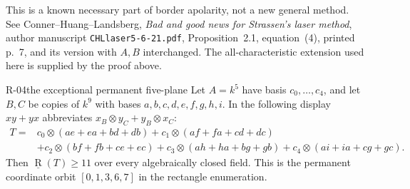 This is a known necessary part of border apolarity, not a new
general method. See Conner--Huang--Landsberg,
\emph{Bad and good news for Strassen's laser method},
author manuscript \texttt{CHLlaser5-6-21.pdf}, Proposition~2.1,
equation~(4), printed p.~7, and its version with $A,B$ interchanged.
The all-characteristic extension used here is supplied by the proof above.

\begin{finding}{R-04}{the exceptional permanent five-plane}
Let $A=k^5$ have basis $c_0,\ldots,c_4$, and let $B,C$ be
copies of $k^9$ with bases $a,b,c,d,e,f,g,h,i$. In the following
display $xy+yx$ abbreviates $x_B\otimes y_C+y_B\otimes x_C$:
\begin{align*}
 T={}&c_0\otimes(ae+ea+bd+db)
     +c_1\otimes(af+fa+cd+dc)\\
   &+c_2\otimes(bf+fb+ce+ec)
     +c_3\otimes(ah+ha+bg+gb)
     +c_4\otimes(ai+ia+cg+gc).
\end{align*}
Then $\underline{\operatorname R}(T)\geq11$ over every
algebraically closed field. This is the permanent coordinate
orbit $[0,1,3,6,7]$ in the rectangle enumeration.
\end{finding}

